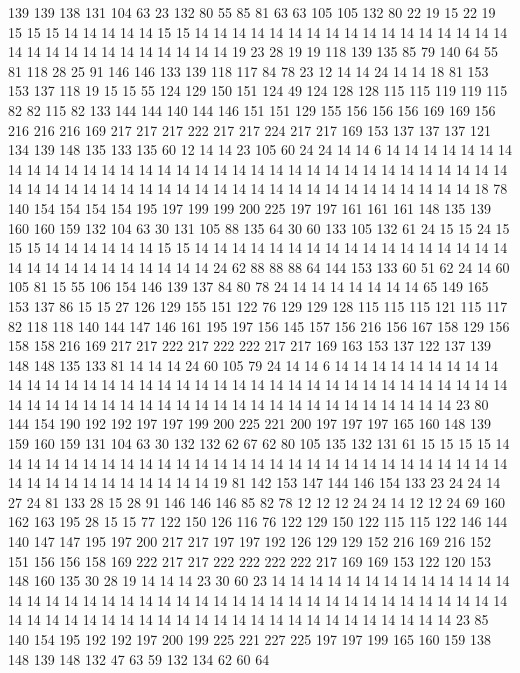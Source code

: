 139 139 138 131 104 63 23 132 80 55 85 81 63 63 105 105 132 80 22 19
15 22 19 15 15 15 14 14 14 14 14 15 15 14 14 14 14 14 14 14
14 14 14 14 14 14 14 14 14 14 14 14 14 14 14 14 14 14 14 14
14 14 19 23 28 19 19 118 139 135 85 79 140 64 55 81 118 28 25 91
146 146 133 139 118 117 84 78 23 12 14 14 24 14 14 18 81 153 153 137
118 19 15 15 55 124 129 150 151 124 49 124 128 128 115 115 119 119 115 82
82 115 82 133 144 144 140 144 146 151 151 129 155 156 156 156 169 169 156 216
216 216 169 217 217 217 222 217 217 224 217 217 169 153 137 137 137 121 134 139
148 135 133 135 60 12 14 14 23 105 60 24 24 14 14 6 14 14 14 14
14 14 14 14 14 14 14 14 14 14 14 14 14 14 14 14 14 14 14 14
14 14 14 14 14 14 14 14 14 14 14 14 14 14 14 14 14 14 14 14
14 14 14 14 14 14 14 14 14 14 14 14 14 14 14 18 78 140 154 154
154 154 195 197 199 199 200 225 197 197 161 161 161 148 135 139 160 160 159 132
104 63 30 131 105 88 135 64 30 60 133 105 132 61 24 15 15 24 15 15
15 14 14 14 14 14 14 15 15 14 14 14 14 14 14 14 14 14 14 14
14 14 14 14 14 14 14 14 14 14 14 14 14 14 14 14 14 24 62 88
88 88 64 144 153 133 60 51 62 24 14 60 105 81 15 55 106 154 146 139
137 84 80 78 24 14 14 14 14 14 14 14 65 149 165 153 137 86 15 15
27 126 129 155 151 122 76 129 129 128 115 115 115 121 115 117 82 118 118 140
144 147 146 161 195 197 156 145 157 156 216 156 167 158 129 156 158 158 216 169
217 217 222 217 222 222 217 217 169 163 153 137 122 137 139 148 148 135 133 81
14 14 14 24 60 105 79 24 14 14 6 14 14 14 14 14 14 14 14 14
14 14 14 14 14 14 14 14 14 14 14 14 14 14 14 14 14 14 14 14
14 14 14 14 14 14 14 14 14 14 14 14 14 14 14 14 14 14 14 14
14 14 14 14 14 14 14 14 14 14 14 23 80 144 154 190 192 192 197 197
199 200 225 221 200 197 197 197 165 160 148 139 159 160 159 131 104 63 30 132
132 62 67 62 80 105 135 132 131 61 15 15 15 15 14 14 14 14 14 14
14 14 14 14 14 14 14 14 14 14 14 14 14 14 14 14 14 14 14 14
14 14 14 14 14 14 14 14 14 14 14 14 14 19 81 142 153 147 144 146
154 133 23 24 24 14 27 24 81 133 28 15 28 91 146 146 146 85 82 78
12 12 12 24 24 14 12 12 24 69 160 162 163 195 28 15 15 77 122 150
126 116 76 122 129 150 122 115 115 122 146 144 140 147 147 195 197 200 217 217
197 197 192 126 129 129 152 216 169 216 152 151 156 156 158 169 222 217 217 222
222 222 222 217 169 169 153 122 120 153 148 160 135 30 28 19 14 14 14 23
30 60 23 14 14 14 14 14 14 14 14 14 14 14 14 14 14 14 14 14
14 14 14 14 14 14 14 14 14 14 14 14 14 14 14 14 14 14 14 14
14 14 14 14 14 14 14 14 14 14 14 14 14 14 14 14 14 14 14 14
14 14 14 14 14 14 14 23 85 140 154 195 192 192 197 200 199 225 221 227
225 197 197 199 165 160 159 138 148 139 148 132 47 63 59 132 134 62 60 64

